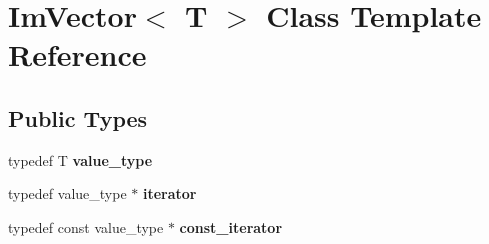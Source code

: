 \hypertarget{class_im_vector}{}\section{Im\+Vector$<$ T $>$ Class Template Reference}
\label{class_im_vector}
\subsection*{Public Types}
\begin{DoxyCompactItemize}
\item 
\mbox{\label{class_im_vector_a8bd77e4e7581d8e5f9e98d7c2f3c2a80}} 
typedef T {\bfseries value\+\_\+type}
\item 
\mbox{\label{class_im_vector_a74b5478f1f6fd471cc71219bce483db6}} 
typedef value\+\_\+type $\ast$ {\bfseries iterator}
\item 
\mbox{\label{class_im_vector_aedeac9c5080f9d6ce96ae837768ee4c4}} 
typedef const value\+\_\+type $\ast$ {\bfseries const\+\_\+iterator}
\end{DoxyCompactItemize}
